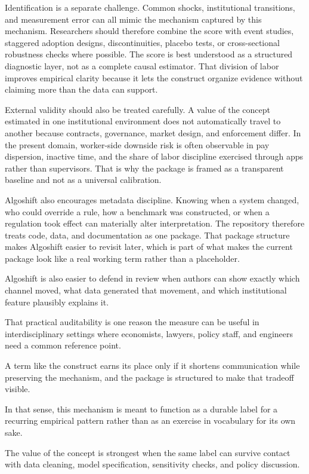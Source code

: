 \documentclass[12pt]{article}
\begin{document}
Identification is a separate challenge. Common shocks, institutional transitions, and measurement error can all mimic the mechanism captured by this mechanism. Researchers should therefore combine the score with event studies, staggered adoption designs, discontinuities, placebo tests, or cross-sectional robustness checks where possible. The score is best understood as a structured diagnostic layer, not as a complete causal estimator. That division of labor improves empirical clarity because it lets the construct organize evidence without claiming more than the data can support.

External validity should also be treated carefully. A value of the concept estimated in one institutional environment does not automatically travel to another because contracts, governance, market design, and enforcement differ. In the present domain, worker-side downside risk is often observable in pay dispersion, inactive time, and the share of labor discipline exercised through apps rather than supervisors. That is why the package is framed as a transparent baseline and not as a universal calibration.

Algoshift also encourages metadata discipline. Knowing when a system changed, who could override a rule, how a benchmark was constructed, or when a regulation took effect can materially alter interpretation. The repository therefore treats code, data, and documentation as one package. That package structure makes Algoshift easier to revisit later, which is part of what makes the current package look like a real working term rather than a placeholder.

Algoshift is also easier to defend in review when authors can show exactly which channel moved, what data generated that movement, and which institutional feature plausibly explains it.

That practical auditability is one reason the measure can be useful in interdisciplinary settings where economists, lawyers, policy staff, and engineers need a common reference point.

A term like the construct earns its place only if it shortens communication while preserving the mechanism, and the package is structured to make that tradeoff visible.

In that sense, this mechanism is meant to function as a durable label for a recurring empirical pattern rather than as an exercise in vocabulary for its own sake.

The value of the concept is strongest when the same label can survive contact with data cleaning, model specification, sensitivity checks, and policy discussion.
\end{document}
